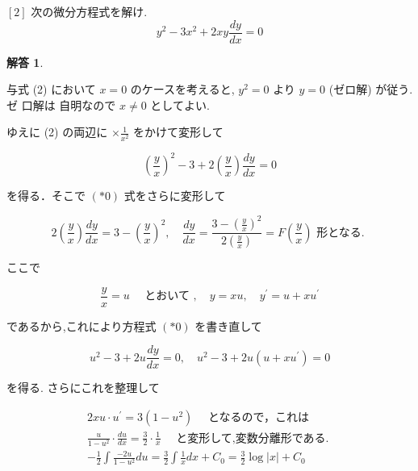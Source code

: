 \documentclass[10pt]{jsarticle}
\newtheorem*{answer*}{解答}
\begin{document}
\bigskip
\bigskip
\bigskip
\bigskip
\bigskip
\bigskip
\bigskip
\bigskip
\bigskip
\bigskip

\begin{itembox}[l]{$[2]$ 次の微分方程式を解け.}
 \begin{equation*}
y^{2}-3 x^{2}+2 x y \frac{d y}{d x}=0 \tag{2}
\end{equation*}
 
\end{itembox}

\begin{answer*}
\end{answer*}

与式 (2) において $x=0$ のケースを考えると, $y^{2}=0$ より $y=0$ (ゼロ解) が従う.ゼ 口解は 自明なので $x \neq 0$ としてよい.

ゆえに (2) の両辺に $\times \frac{1}{x^{2}}$ をかけて変形して


\begin{equation*}
\left(\frac{y}{x}\right)^{2}-3+2\left(\frac{y}{x}\right) \frac{d y}{d x}=0 \tag{*0}
\end{equation*}


を得る．そこで $(* 0)$ 式をさらに変形して


\begin{equation*}
2\left(\frac{y}{x}\right) \frac{d y}{d x}=3-\left(\frac{y}{x}\right)^{2}, \quad \frac{d y}{d x}=\frac{3-\left(\frac{y}{x}\right)^{2}}{2\left(\frac{y}{x}\right)}=F\left(\frac{y}{x}\right) \text { 形となる. } \tag{*1}
\end{equation*}

ここで

\begin{equation*}
\frac{y}{x}=u \quad \text { とおいて }, \quad y=x u, \quad y^{\prime}=u+x u^{\prime} \tag{*2}
\end{equation*}


であるから,これにより方程式 $(* 0)$ を書き直して

$$
u^{2}-3+2 u \frac{d y}{d x}=0, \quad u^{2}-3+2 u\left(u+x u^{\prime}\right)=0
$$

を得る. さらにこれを整理して

$$
\begin{gathered}
2 x u \cdot u^{\prime}=3\left(1-u^{2}\right) \quad \text { となるので，これは } \\
\frac{u}{1-u^{2}} \cdot \frac{d u}{d x}=\frac{3}{2} \cdot \frac{1}{x} \quad \text { と変形して,変数分離形である. } \\
-\frac{1}{2} \int \frac{-2 u}{1-u^{2}} d u=\frac{3}{2} \int \frac{1}{x} d x+C_{0}=\frac{3}{2} \log |x|+C_{0}
\end{gathered}
$$
\end{document}
